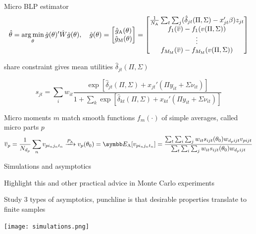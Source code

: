 \documentclass[aspectratio=169,10pt]{beamer}
\begin{document}
\begin{frame}[label=estimator]{Micro BLP estimator}
    \vspace{-0.5em}
    \begin{equation*}
        \hat{\theta} = \operatorname*{arg\,min}_\theta \hat{g}(\theta)'\hat{W}\hat{g}(\theta), \quad \hat{g}(\theta) =
        \begin{bmatrix}
            \hat{g}_\mathrm{A}(\theta) \\
            \hat{g}_\mathrm{M}(\theta)
        \end{bmatrix}
        =
        \begin{bmatrix}
            \frac{1}{N_\mathrm{A}} \sum_t \sum_j (\hat{\delta}_{jt}(\Pi, \Sigma) - x_{jt}'\beta) z_{jt} \\
            f_1(\overline{v}) - f_1(v(\Pi, \Sigma)) \\
            \vdots \\
            f_{M_\mathrm{M}}(\overline{v}) - f_{M_\mathrm{M}}(v(\Pi, \Sigma))
        \end{bmatrix}
    \end{equation*}
    \begin{wideitemize}
        \item {} share constraint gives mean utilities $\hat{\delta}_{jt}(\Pi, \Sigma)$
    \end{wideitemize}
    \begin{equation*}
        s_{jt} = \sum_i w_{it}  \frac{\exp[\hat{\delta}_{jt}(\Pi, \Sigma) + x_{jt}'(\Pi y_{it} + \Sigma \nu_{it})]}{1 + \sum_k \exp[\hat{\delta}_{kt}(\Pi, \Sigma) + x_{kt}'(\Pi y_{it} + \Sigma \nu_{it})]}
    \end{equation*}
    \begin{wideitemize}
        \item Micro moments $m$ match smooth functions $f_m(\cdot)$ of simple averages, called micro parts $p$
        \begin{equation*}
            \overline{v}_p = \frac{1}{N_{d_p}} \sum_n v_{pi_nj_nt_n} \xrightarrow{P_\mathrm{A}} v_p(\theta_0) = \E_\mathrm{A}[v_{pi_nj_nt_n}] = \frac{\sum_t \sum_i \sum_j w_{it} s_{ijt}(\theta_0) w_{d_pijt} v_{pijt}}{\sum_t \sum_i \sum_j w_{it} s_{ijt}(\theta_0) w_{d_pijt}}
        \end{equation*}
    \end{wideitemize}
\end{frame}



\begin{frame}{Simulations and asymptotics}
    \vspace{0.5em}
    \begin{wideitemize}
        \item Highlight this and other practical advice in Monte Carlo experiments
        \pause
        \item Study \alert{3 types of asymptotics}, punchline is that desirable properties translate to finite samples
    \end{wideitemize}
    \vspace{0.5em}
    \texttt{[image: simulations.png]}
\end{frame}
\end{document}
